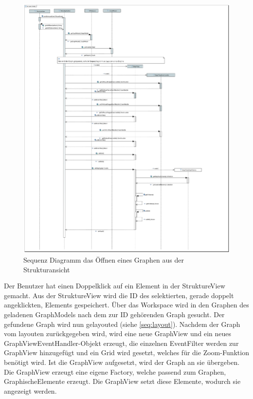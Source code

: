 \begin{figure}[!htbp]
	\centering
	\includegraphics[width=450pt]{resourcen/SeqDiagramOpenGraph.PDF}
	\caption{Sequenz Diagramm das Öffnen eines Graphen aus der Strukturansicht}
	\label{fig:seq:openMethod}
\end{figure}

Der Benutzer hat einen Doppelklick auf ein Element in der StruktureView gemacht. Aus der StruktureView wird die ID des selektierten, gerade doppelt angeklickten, Elements gespeichert. Über das Workspace wird in den Graphen des geladenen GraphModels nach dem zur ID gehörenden Graph gesucht. Der gefundene Graph wird nun gelayouted (siehe \ref{seq:layout}). Nachdem der Graph vom layouten zurückgegeben wird, wird eine neue GraphView und ein neues GraphViewEventHandler-Objekt erzeugt, die einzelnen EventFilter werden zur GraphView hinzugefügt und ein Grid wird gesetzt, welches für die Zoom-Funktion benötigt wird. Ist die GraphView aufgesetzt, wird der Graph an sie übergeben. Die GraphView erzeugt eine eigene Factory, welche passend zum Graphen, GraphischeElemente erzeugt. Die GraphView setzt diese Elemente, wodurch sie angezeigt werden.

